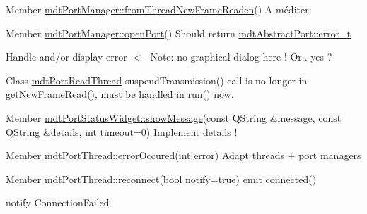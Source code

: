 \begin{DoxyDescription}
\item[Member \hyperlink{classmdt_port_manager_a4fcc8f0699b655156e661bb3de6056cc}{mdtPortManager::fromThreadNewFrameReaden}() ]A méditer: 
\end{DoxyDescription}

\label{todo__todo000042}
\hypertarget{todo__todo000042}{}
 
\begin{DoxyDescription}
\item[Member \hyperlink{classmdt_port_manager_aab594613e8985590c835194efbc27b5e}{mdtPortManager::openPort}() ]Should return \hyperlink{classmdt_abstract_port_ad4121bb930c95887e77f8bafa065a85e}{mdtAbstractPort::error\_\-t} 

Handle and/or display error $<$-\/ Note: no graphical dialog here ! Or.. yes ? 
\end{DoxyDescription}

\label{todo__todo000044}
\hypertarget{todo__todo000044}{}
 
\begin{DoxyDescription}
\item[Class \hyperlink{classmdt_port_read_thread}{mdtPortReadThread} ]suspendTransmission() call is no longer in getNewFrameRead(), must be handled in run() now. 
\end{DoxyDescription}

\label{todo__todo000045}
\hypertarget{todo__todo000045}{}
 
\begin{DoxyDescription}
\item[Member \hyperlink{classmdt_port_status_widget_a8fce28ddb290512f5681cf800ac17b81}{mdtPortStatusWidget::showMessage}(const QString \&message, const QString \&details, int timeout=0) ]Implement details ! 
\end{DoxyDescription}

\label{todo__todo000048}
\hypertarget{todo__todo000048}{}
 
\begin{DoxyDescription}
\item[Member \hyperlink{classmdt_port_thread_ab31cbe1a85aa830cd368654d1f806326}{mdtPortThread::errorOccured}(int error) ]Adapt threads + port managers
\end{DoxyDescription}

\label{todo__todo000046}
\hypertarget{todo__todo000046}{}
 
\begin{DoxyDescription}
\item[Member \hyperlink{classmdt_port_thread_abee1d2f9b67ca37cfd13e108ca978b36}{mdtPortThread::reconnect}(bool notify=true) ]emit connected() 

notify ConnectionFailed 
\end{DoxyDescription}

